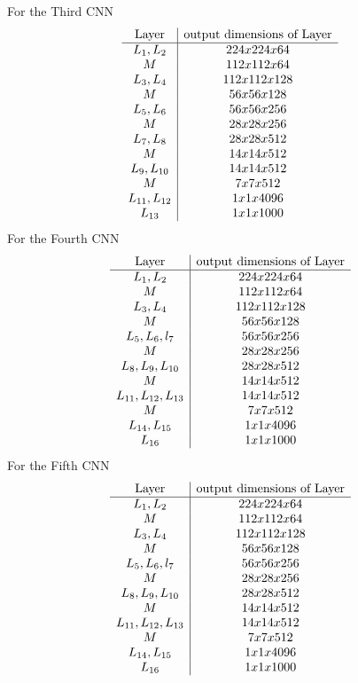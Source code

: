 \documentclass[12pt,english]{article}
\begin{document}
For the Third CNN
\begin{equation*}
\begin{array}{c|c}
 \hbox{Layer}& \hbox{output dimensions of Layer}  \\
\hline
L_1,L_2 & 224x224x64 \\
M & 112x112x64 \\
L_3,L_4 & 112x112x128 \\
M & 56x56x128 \\
L_5,L_6 & 56x56x256 \\
M & 28x28x256\\
L_7,L_8 & 28x28x512 \\
M & 14x14x512\\
L_9,L_{10} & 14x14x512 \\
M & 7x7x512\\
L_{11},L_{12} & 1x1x4096 \\
L_{13} & 1x1x1000 
\end{array} 
\end{equation*}
For the Fourth CNN
\begin{equation*}
\begin{array}{c|c}
 \hbox{Layer}& \hbox{output dimensions of Layer}  \\
\hline
L_1,L_2 & 224x224x64 \\
M & 112x112x64 \\
L_3,L_4 & 112x112x128 \\
M & 56x56x128 \\
L_5,L_6,l_7 & 56x56x256 \\
M & 28x28x256\\
L_8,L_9,L_{10} & 28x28x512 \\
M & 14x14x512\\
L_{11},L_{12},L_{13} & 14x14x512 \\
M & 7x7x512\\
L_{14},L_{15} & 1x1x4096 \\
L_{16} & 1x1x1000 
\end{array} 
\end{equation*}
For the Fifth CNN
\begin{equation*}
\begin{array}{c|c}
 \hbox{Layer}& \hbox{output dimensions of Layer}  \\
\hline
L_1,L_2 & 224x224x64 \\
M & 112x112x64 \\
L_3,L_4 & 112x112x128 \\
M & 56x56x128 \\
L_5,L_6,l_7 & 56x56x256 \\
M & 28x28x256\\
L_8,L_9,L_{10} & 28x28x512 \\
M & 14x14x512\\
L_{11},L_{12},L_{13} & 14x14x512 \\
M & 7x7x512\\
L_{14},L_{15} & 1x1x4096 \\
L_{16} & 1x1x1000 
\end{array} 
\end{equation*}
\end{document}
